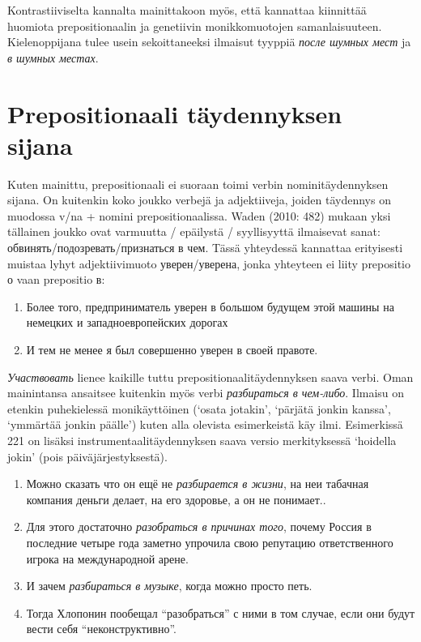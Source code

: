 \documentclass[]{scrreprt}
\providecommand{\tightlist}{%
  \setlength{\itemsep}{0pt}\setlength{\parskip}{0pt}}
\begin{document}
Kontrastiiviselta kannalta mainittakoon myös, että kannattaa kiinnittää
huomiota prepositionaalin ja genetiivin monikkomuotojen samanlaisuuteen.
Kielenoppijana tulee usein sekoittaneeksi ilmaisut tyyppiä \emph{после
шумных мест} ja \emph{в шумных местах}.

\section{Prepositionaali täydennyksen
sijana}\label{prepositionaali-tuxe4ydennyksen-sijana}

Kuten mainittu, prepositionaali ei suoraan toimi verbin
nominitäydennyksen sijana. On kuitenkin koko joukko verbejä ja
adjektiiveja, joiden täydennys on muodossa v/na + nomini
prepositionaalissa. Waden (2010: 482) mukaan yksi tällainen joukko ovat
varmuutta / epäilystä / syyllisyyttä ilmaisevat sanat:
обвинять/подозревать/признаться в чем. Tässä yhteydessä kannattaa
erityisesti muistaa lyhyt adjektiivimuoto уверен/уверена, jonka
yhteyteen ei liity prepositio о vaan prepositio в:

\begin{enumerate}
\def\labelenumi{(\arabic{enumi})}
\setcounter{enumi}{215}
\tightlist
\item
  Более того, предприниматель уверен в большом будущем этой машины на
  немецких и западноевропейских дорогах
\item
  И тем не менее я был совершенно уверен в своей правоте.
\end{enumerate}

\emph{Участвовать} lienee kaikille tuttu prepositionaalitäydennyksen
saava verbi. Oman mainintansa ansaitsee kuitenkin myös verbi
\emph{разбираться в чем-либо}. Ilmaisu on etenkin puhekielessä
monikäyttöinen (`osata jotakin', `pärjätä jonkin kanssa', `ymmärtää
jonkin päälle') kuten alla olevista esimerkeistä käy ilmi. Esimerkissä
221 on lisäksi instrumentaalitäydennyksen saava versio merkityksessä
`hoidella jokin' (pois päiväjärjestyksestä).

\begin{enumerate}
\def\labelenumi{(\arabic{enumi})}
\setcounter{enumi}{217}
\tightlist
\item
  Можно сказать что он ещё не \emph{разбирается в жизни}, на неи
  табачная компания деньги делает, на его здоровье, а он не понимает..
\item
  Для этого достаточно \emph{разобраться в причинах того}, почему Россия
  в последние четыре года заметно упрочила свою репутацию ответственного
  игрока на международной арене.
\item
  И зачем \emph{разбираться в музыке}, когда можно просто петь.
\item
  Тогда Хлопонин пообещал ``разобраться'' с ними в том случае, если они
  будут вести себя ``неконструктивно''.
\end{enumerate}
\end{document}
